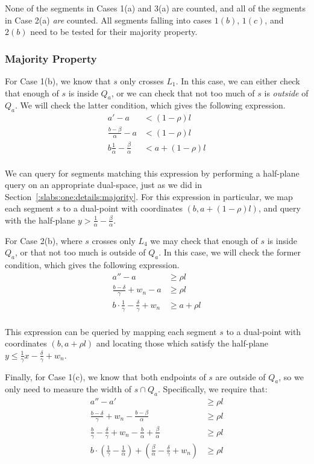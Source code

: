 None of the segments in Cases 1(a) and 3(a) are counted, and all of the segments in Case 2(a) \emph{are} counted. All segments falling into cases $1(b)$, $1(c)$, and $2(b)$ need to be tested for their majority property.


\subsubsection{Majority Property}

For Case 1(b), we know that $s$ only crosses $L_1$. In this case, we can either check that enough of $s$ is inside $Q_a$, or we can check that not too much of $s$ is \emph{outside} of $Q_a$.  We will check the latter condition, which gives the following expression.
\[
\begin{split}
a' - a &< (1 - \rho)l \\
%
\frac{b - \beta}{\alpha} - a &< (1 - \rho)l \\
%
b \frac{1}{\alpha} - \frac{\beta}{\alpha} &< a + (1 - \rho)l \\
%
\end{split}
\]

We can query for segments matching this expression by performing a half-plane query on an appropriate dual-space, just as we did in Section~\ref{:slabs:one:details:majority}. For this expression in particular, we map each segment $s$ to a dual-point with coordinates $(b, a + (1-\rho)l)$, and query with the half-plane $y > \frac{1}{\alpha} - \frac{\beta}{\alpha}$.

For Case 2(b), where $s$ crosses only $L_4$ we may check that enough of $s$ is inside $Q_a$, or that not too much is outside of $Q_a$. In this case, we will check the former condition, which gives the following expression.
\[
\begin{split}
a'' - a &\geq \rho l \\
%
\frac{b - \delta}{\gamma} + w_n - a &\geq \rho l \\
%
b \cdot \frac{1}{\gamma} - \frac{\delta}{\gamma} + w_n &\geq a + \rho l \\
%
\end{split}
\]

This expression can be queried by mapping each segment $s$ to a dual-point with coordinates $(b, a + \rho l)$ and locating those which satisfy the half-plane $y \leq \frac{1}{\gamma} x - \frac{\delta}{\gamma} + w_n$.

Finally, for Case 1(c), we know that both endpoints of $s$ are outside of $Q_a$, so we only need to measure the width of $s \cap Q_a$.  Specifically, we require that:
\[
\begin{split} 
a'' - a' &\geq \rho l \\
%
\frac{b - \delta}{\gamma} + w_n - \frac{b - \beta}{\alpha} &\geq \rho l \\
%
\frac{b}{\gamma} - \frac{\delta}{\gamma} + w_n - \frac{b}{\alpha} + \frac{\beta}{\alpha} &\geq \rho l \\
%
b \cdot \left ( \frac{1}{\gamma} - \frac{1}{\alpha} \right ) + \left ( \frac{\beta}{\alpha} - \frac{\delta}{\gamma} + w_n \right ) &\geq \rho l \\
%
\end{split}
\]


